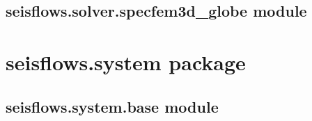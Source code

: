 \documentclass[letterpaper,10pt,english]{sphinxmanual}
\begin{document}
\begin{fulllineitems}

\begin{fulllineitems}
\label{\detokenize{ref/seisflows.solver:seisflows.solver.specfem3d.specfem3d.write_receivers}}
\end{fulllineitems}


\begin{fulllineitems}
\label{\detokenize{ref/seisflows.solver:seisflows.solver.specfem3d.specfem3d.write_sources}}
\end{fulllineitems}


\end{fulllineitems}



\subsection{seisflows.solver.specfem3d\_globe module}
\label{\detokenize{ref/seisflows.solver:seisflows-solver-specfem3d-globe-module}}

\section{seisflows.system package}
\label{\detokenize{ref/seisflows.system:seisflows-system-package}}\label{\detokenize{ref/seisflows.system:sfsystem}}\label{\detokenize{ref/seisflows.system::doc}}

\subsection{seisflows.system.base module}
\label{\detokenize{ref/seisflows.system:module-seisflows.system.base}}\label{\detokenize{ref/seisflows.system:seisflows-system-base-module}}
\end{document}
